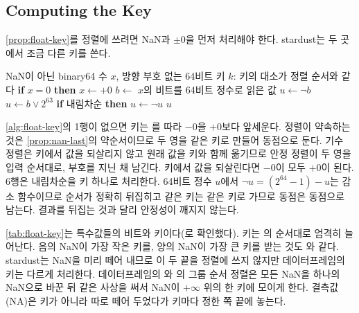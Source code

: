 \subsection{Computing the Key}

\cref{prop:float-key}를 정렬에 쓰려면 NaN과 $\pm0$을 먼저 처리해야 한다. stardust는 두 곳에서 조금 다른 키를 쓴다.

\begin{algorithm}[htbp]
\begin{algorithmic}[1]
\Require NaN이 아닌 binary64 수 $x$, 방향
\Ensure 부호 없는 64비트 키 $k$: 키의 대소가 정렬 순서와 같다
\State \textbf{if} $x=0$ \textbf{then} $x\gets+0$ 
\State $b\gets$ $x$의 비트를 64비트 정수로 읽은 값
 $u\gets\lnot b$ 
\Else\ $u\gets b\lor2^{63}$ 
\EndIf
\State \textbf{if} 내림차순 \textbf{then} $u\gets\lnot u$ 
\State \Return $u$
\end{algorithmic}
\caption{binary64의 정렬 키 (stardust 배열의 )}
\label{alg:float-key}
\end{algorithm}

\cref{alg:float-key}의 1행이 없으면 키는 를 따라 $-0$을 $+0$보다 앞세운다. 정렬이 약속하는 것은 \cref{prop:nan-last}의 약순서이므로 두 영을 같은 키로 만들어 동점으로 둔다. 기수 정렬은 키에서 값을 되살리지 않고 원래 값을 키와 함께 옮기므로 안정 정렬이 두 영을 입력 순서대로, 부호를 지닌 채 남긴다. 키에서 값을 되살린다면 $-0$이 모두 $+0$이 된다. 6행은 내림차순을 키 하나로 처리한다. 64비트 정수 $u$에서 $\lnot u=(2^{64}-1)-u$는 감소 함수이므로 순서가 정확히 뒤집히고 같은 키는 같은 키로 가므로 동점은 동점으로 남는다. 결과를 뒤집는 것과 달리 안정성이 깨지지 않는다.

\cref{tab:float-key}는 특수값들의 비트와 키이다(로 확인했다). 키는 의 순서대로 엄격히 늘어난다. 음의 NaN이 가장 작은 키를, 양의 NaN이 가장 큰 키를 받는 것도 와 같다. stardust는 NaN을 미리 떼어 내므로 이 두 끝을 정렬에 쓰지 않지만 데이터프레임의 키는 다르게 처리한다. 데이터프레임의 와 의 그룹 순서 정렬은 모든 NaN을 하나의 NaN으로 바꾼 뒤 같은 사상을 써서 NaN이 $+\infty$ 위의 한 키에 모이게 한다. 결측값(NA)은 키가 아니라 따로 떼어 두었다가 키마다 정한 쪽 끝에 놓는다.

